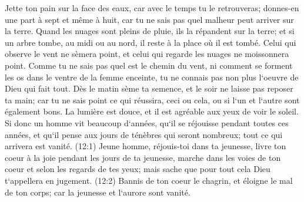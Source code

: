 \verse Jette ton pain sur la face des eaux, car avec le temps tu le retrouveras; 
\verse donnes-en une part à sept et même à huit, car tu ne sais pas quel malheur peut arriver sur la terre. 
\verse Quand les nuages sont pleins de pluie, ils la répandent sur la terre; et si un arbre tombe, au midi ou au nord, il reste à la place où il est tombé. 
\verse Celui qui observe le vent ne sèmera point, et celui qui regarde les nuages ne moissonnera point. 
\verse Comme tu ne sais pas quel est le chemin du vent, ni comment se forment les os dans le ventre de la femme enceinte, tu ne connais pas non plus l`oeuvre de Dieu qui fait tout. 
\verse Dès le matin sème ta semence, et le soir ne laisse pas reposer ta main; car tu ne sais point ce qui réussira, ceci ou cela, ou si l`un et l`autre sont également bons. 
\verse La lumière est douce, et il est agréable aux yeux de voir le soleil. 
\verse Si donc un homme vit beaucoup d`années, qu`il se réjouisse pendant toutes ces années, et qu`il pense aux jours de ténèbres qui seront nombreux; tout ce qui arrivera est vanité. 
\verse (12:1) Jeune homme, réjouis-toi dans ta jeunesse, livre ton coeur à la joie pendant les jours de ta jeunesse, marche dans les voies de ton coeur et selon les regards de tes yeux; mais sache que pour tout cela Dieu t`appellera en jugement. 
\verse (12:2) Bannis de ton coeur le chagrin, et éloigne le mal de ton corps; car la jeunesse et l`aurore sont vanité. 

\chapter{}

